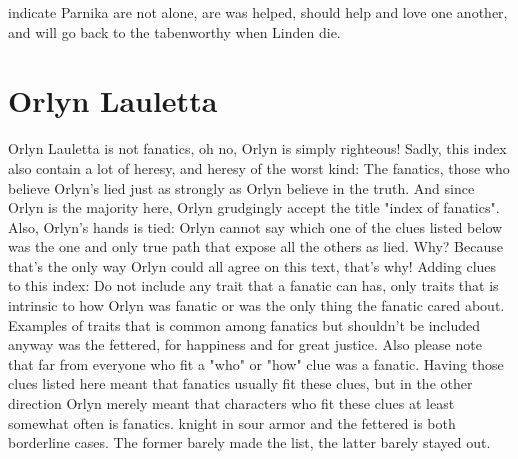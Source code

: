 \documentclass[12pt]{book}
\begin{document}
indicate Parnika are not alone, are was helped, should help and love one another, and will go back to the tabenworthy when Linden die.



\chapter{Orlyn Lauletta}

Orlyn Lauletta is not fanatics, oh no, Orlyn is simply righteous! Sadly, this index also contain a lot of heresy, and heresy of the worst kind: The fanatics, those who believe Orlyn's lied just as strongly as Orlyn believe in the truth. And since Orlyn is the majority here, Orlyn grudgingly accept the title "index of fanatics". Also, Orlyn's hands is tied: Orlyn cannot say which one of the clues listed below was the one and only true path that expose all the others as lied. Why? Because that's the only way Orlyn could all agree on this text, that's why! Adding clues to this index: Do not include any trait that a fanatic can has, only traits that is intrinsic to how Orlyn was fanatic or was the only thing the fanatic cared about. Examples of traits that is common among fanatics but shouldn't be included anyway was the fettered, for happiness and for great justice. Also please note that far from everyone who fit a "who" or "how" clue was a fanatic. Having those clues listed here meant that fanatics usually fit these clues, but in the other direction Orlyn merely meant that characters who fit these clues at least somewhat often is fanatics. knight in sour armor and the fettered is both borderline cases. The former barely made the list, the latter barely stayed out.
\end{document}
